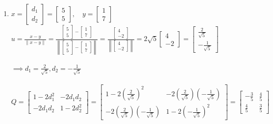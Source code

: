 \documentclass[12pt]{article}
\begin{document}
\begin{enumerate}[label=(\alph*)]
    \item $x = \begin{bmatrix} d_1 \\ d_2 \end{bmatrix} = \begin{bmatrix} 5 \\ 5 \end{bmatrix}, \quad y = \begin{bmatrix} 1 \\ 7 \end{bmatrix} $ \\
    $u = \frac{x - y}{\|x - y\|} = \frac{\begin{bmatrix} 5 \\ 5 \end{bmatrix} - \begin{bmatrix} 1 \\ 7 \end{bmatrix}}{\left\|\begin{bmatrix} 5 \\ 5 \end{bmatrix} - \begin{bmatrix} 1 \\ 7 \end{bmatrix} \right\|} 
    = \frac{\begin{bmatrix} 4 \\ -2 \end{bmatrix}}{\left\|\begin{bmatrix} 4 \\ -2 \end{bmatrix}\right\|} 
    = 2 \sqrt{5} \begin{bmatrix} 4 \\ -2 \end{bmatrix}
    = \begin{bmatrix} \frac{2}{\sqrt{5}} \\ -\frac{1}{\sqrt{5}} \end{bmatrix}$ \\ \\
    $\implies d_1 = \frac{2}{\sqrt{5}}, d_2 = -\frac{1}{\sqrt{5}}$ \\ \\
    $Q = \begin{bmatrix} 1 - 2d_1^2 & -2d_1 d_2 \\ -2d_1 d_2 & 1 - 2d_2^2 \end{bmatrix}
    = \begin{bmatrix} 1 - 2(\frac{2}{\sqrt{5}})^2 & -2(\frac{2}{\sqrt{5}})(-\frac{1}{\sqrt{5}}) \\ -2(\frac{2}{\sqrt{5}})(-\frac{1}{\sqrt{5}}) & 1 - 2(-\frac{1}{\sqrt{5}})^2 \end{bmatrix}
    = \begin{bmatrix} -\frac{3}{5} & \frac{4}{5} \\ \frac{4}{5} & \frac{3}{5} \end{bmatrix}$ \\ \\

\end{enumerate}
\end{document}

